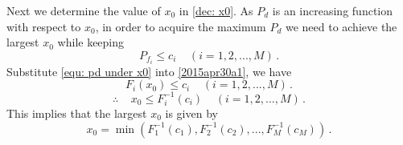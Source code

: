   Next we determine the value of $x_0$ in \eqref{dec: x0}. 
  As $P_d$ is an increasing function with respect to $x_0$, in order to acquire the maximum $P_d$ we need to achieve the largest $x_0$ while keeping 
  \begin{equation}
	P_{f_i} \leq c_i\;\;\;\;(i = 1, 2, ..., M)\,.
	\label{2015apr30a1}
  \end{equation}
  Substitute \eqref{equ: pd under x0} into \eqref{2015apr30a1}, we have
  \begin{equation}
	F_i(x_0) \leq c_i \;\;\;\;(i=1, 2, ..., M)\,.
  \end{equation}
  \begin{equation}
	\label{1125a1}
	\therefore\;\;\;\; x_0 \leq F^{-1}_{i}(c_i) \;\;\;\;(i=1, 2, ..., M)\,.
  \end{equation}
This implies that the largest $x_0$ is given by 
  \begin{equation}
	\label{1127a2}
	x_0 = \min(F_1^{-1}(c_1), F_2^{-1}(c_2), ..., F_M^{-1}(c_M))\,.
  \end{equation}
  \typeout{}
  

  \typeout{}
  
